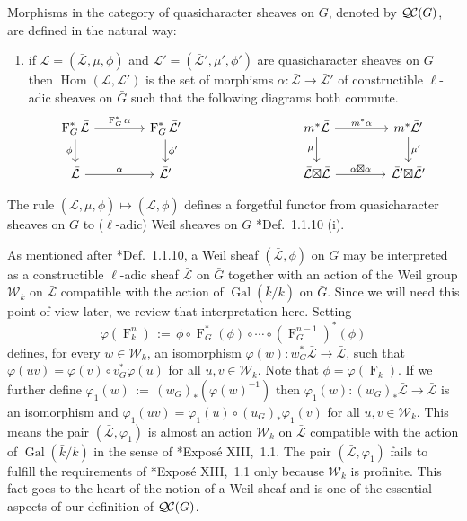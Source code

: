 \documentclass[11pt]{amsart}
\makeatletter
\theoremstyle{plain}
\theoremstyle{definition}
\theoremstyle{remark}
\newtheorem{remark}[theorem]{Remark}
\newcommand{\bFq}{\bar{k}}
\newcommand{\Fq}{k}
\DeclareMathOperator{\Gal}{Gal}
\newcommand{\Frob}[1]{\operatorname{F}_{#1}}
\DeclareMathOperator{\Hom}{Hom}
\newcommand{\ceq}{{\, :=\, }}
\newcommand{\cs}[1]{{\mathcal{#1}}}
\newcommand{\gcs}[1]{{\mathcal{\bar #1}}}
\newcommand{\QC}{{\mathcal{Q\hskip-0.8pt C}}}
\newcommand{\Weil}[1]{\mathcal{W}_{#1}}
\newcommand{\labitem}[2]{%
\def\@itemlabel{\textbf{#1}}
\item
\def\@currentlabel{#1}\label{#2}}
\newcommand{\bG}{\bar{G}}
\newcommand{\tight}[3]{\hspace{-#1pt}{#2}\hspace{-#3pt}}
\newcommand{\LxL}{\text{$\gcs{L} \tight{0}{\boxtimes}{0} \gcs{L}$}}
\makeatother
\begin{document}
Morphisms in the category of quasicharacter sheaves on $G$, denoted by $\QC(G)$, are defined in the natural way:
\begin{enumerate}
\labitem{(CS.3)}{CS.3} if $\cs{L} = (\gcs{L},\mu,\phi)$ and
  $\cs{L'} = (\gcs{L'},\mu',\phi')$ are quasicharacter sheaves on $G$ then
  $\Hom(\cs{L},\cs{L'})$ is the set of morphisms $\alpha : \gcs{L} \to \gcs{L'}$
  of constructible $\ell$-adic sheaves on $\bG$ such that the following diagrams both commute.
  \[
  \begin{tikzcd}[column sep=40]
  \Frob{G}^* \gcs{L} \rar{\Frob{G}^* \alpha} \arrow[swap]{d}{\phi} & \Frob{G}^* \gcs{L'} \dar{\phi'}
  & %
  & \arrow[swap]{d}{\mu} m^* \gcs{L} \rar{m^* \alpha} & m^* \gcs{L'} \dar{\mu'} \\
  \gcs{L} \rar{\alpha} & \gcs{L'}
  & {} & \LxL \rar{\tight{1}{\alpha\boxtimes \alpha}{1}} & \gcs{L'} \tight{0}{\boxtimes}{0} \gcs{L'}
  \end{tikzcd}
  \]
\end{enumerate}

The rule $(\gcs{L},\mu,\phi) \mapsto (\gcs{L},\phi)$ defines a forgetful functor from quasicharacter sheaves on $G$ to ($\ell$-adic) Weil sheaves on $G$ \cite{deligne:80a}*{Def.~1.1.10 (i)}.

As mentioned after \cite{deligne:80a}*{Def.~1.1.10}, a Weil sheaf $(\gcs{L},\phi)$ on $G$ may be interpreted as a constructible $\ell$-adic sheaf $\gcs{L}$ on $\bG$ together with an action of the Weil group $\Weil{\Fq}$ on $\gcs{L}$ compatible with the action of $\Gal(\bFq/\Fq)$ on $\bG$. Since we will need this point of view later, we review that interpretation here. Setting 
\[
\varphi(\Frob{\Fq}^n) \ceq  \phi \circ \Frob{G}^*(\phi) \circ \cdots \circ (\Frob{G}^{n-1})^*(\phi)
\]
defines, for every $w\in \Weil{\Fq}$, an isomorphism
$\varphi(w) : w_G^* \gcs{L}\to \gcs{L}$, such that
$\varphi(uv) = \varphi(v) \circ v_G^* \varphi(u)$ for all $u,v\in \Weil{\Fq}$.
Note that $\phi = \varphi(\Frob{\Fq})$. 
If we further define $\varphi_1(w) \ceq (w_G)_*(\varphi(w)^{-1})$ then
$\varphi_1(w) : (w_G)_* \gcs{L}\to \gcs{L}$ is an isomorphism and
$\varphi_1(uv) = \varphi_1(u) \circ (u_G)_* \varphi_1(v)$ for all $u,v\in \Weil{\Fq}$.
This means the pair $(\gcs{L},\varphi_1)$ is almost an action $\Weil{\Fq}$ on $\gcs{L}$ compatible with the action of $\Gal(\bFq/\Fq)$ in the sense of \cite{deligne:SGA4.5}*{Expos\'e XIII,~1.1}. The pair $(\gcs{L},\varphi_1)$ fails to fulfill the requirements of \cite{deligne:SGA4.5}*{Expos\'e XIII,~1.1} only because $\Weil{\Fq}$ is profinite. This fact goes to the heart of the notion of a Weil sheaf and is one of the essential aspects of our definition of $\QC(G)$. 
\end{document}
